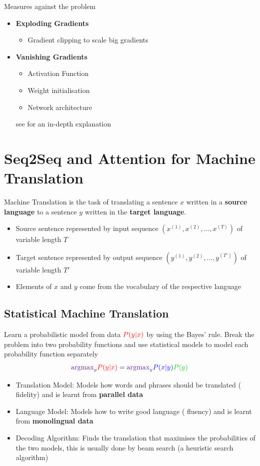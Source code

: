 \documentclass[11pt]{article}
\begin{document}
Measures against the problem
\begin{itemize}
	\item \textbf{Exploding Gradients}
	\begin{itemize}
		\item Gradient clipping to scale big gradients
	\end{itemize}
	\item \textbf{Vanishing Gradients}
	\begin{itemize}
		\item Activation Function
		\item Weight initialisation
		\item Network architecture
	\end{itemize}
	see \cite{pascanu2013difficulty} for an in-depth explanation
\end{itemize}

\section{Seq2Seq and Attention for Machine Translation}

Machine Translation is the task of translating a sentence $x$ written in a \textbf{source language} to a sentence $y$ written in the \textbf{target language}.
\begin{itemize}[label=-]
	\item Source sentence represented by input sequence $(x^{(1)},x^{(2)},\dots,x^{(T)})$ of variable length $T$
	\item Target sentence represented by output sequence $(y^{(1)},y^{(2)},\dots,y^{(T')})$ of variable length $T'$
	\item Elements of $x$ and $y$ come from the vocabulary of the respective language
\end{itemize}

\subsection{Statistical Machine Translation}
Learn a probabilistic model from data ${\color{red} P(y|x)}$ by using the Bayes' rule. Break the problem into two probability functions and use statistical models to model each probability function separately
\begin{equation*}
	{\color{DarkOrchid4}\text{argmax}_y} {\color{red} P(y|x)} = {\color{DarkOrchid4}\text{argmax}_y} {\color{blue} P(x|y)}{\color{Green3} P(y)}
\end{equation*}
\begin{itemize}[label=-]
	\item {\color{blue} Translation Model}: Models how words and phrases should be translated ({\color{blue} fidelity}) and is learnt from \textbf{parallel data}
	\item {\color{Green3} Language Model}: Models how to write good language ({\color{Green3} fluency}) and is learnt from \textbf{monolingual data}
	\item {\color{DarkOrchid4} Decoding Algorithm}: Finds the translation that maximises the probabilities of the two models, this is usually done by beam search (a heuristic search algorithm)
\end{itemize}
\end{document}
